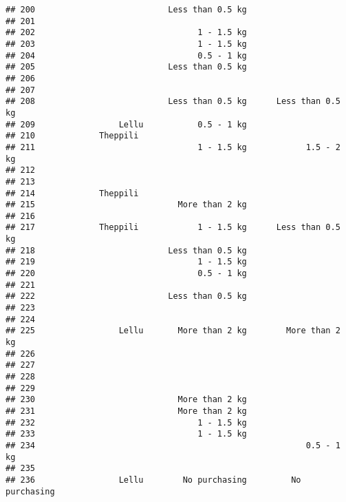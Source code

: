 \documentclass[
]{article}
\begin{document}
\begin{verbatim}
## 200                           Less than 0.5 kg                      
## 201                                                                 
## 202                                 1 - 1.5 kg                      
## 203                                 1 - 1.5 kg                      
## 204                                 0.5 - 1 kg                      
## 205                           Less than 0.5 kg                      
## 206                                                                 
## 207                                                                 
## 208                           Less than 0.5 kg      Less than 0.5 kg
## 209                 Lellu           0.5 - 1 kg                      
## 210             Theppili                                            
## 211                                 1 - 1.5 kg            1.5 - 2 kg
## 212                                                                 
## 213                                                                 
## 214             Theppili                                            
## 215                             More than 2 kg                      
## 216                                                                 
## 217             Theppili            1 - 1.5 kg      Less than 0.5 kg
## 218                           Less than 0.5 kg                      
## 219                                 1 - 1.5 kg                      
## 220                                 0.5 - 1 kg                      
## 221                                                                 
## 222                           Less than 0.5 kg                      
## 223                                                                 
## 224                                                                 
## 225                 Lellu       More than 2 kg        More than 2 kg
## 226                                                                 
## 227                                                                 
## 228                                                                 
## 229                                                                 
## 230                             More than 2 kg                      
## 231                             More than 2 kg                      
## 232                                 1 - 1.5 kg                      
## 233                                 1 - 1.5 kg                      
## 234                                                       0.5 - 1 kg
## 235                                                                 
## 236                 Lellu        No purchasing         No purchasing

\end{verbatim}
\end{document}

